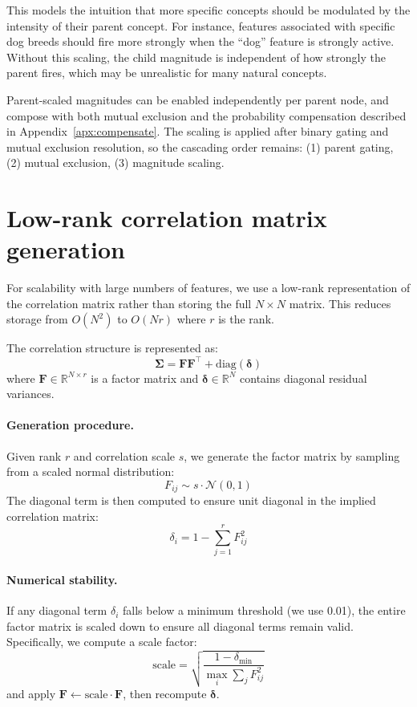 \documentclass{article}
\theoremstyle{plain}
\theoremstyle{definition}
\theoremstyle{remark}
\begin{document}
This models the intuition that more specific concepts should be modulated by the intensity of their parent concept. For instance, features associated with specific dog breeds should fire more strongly when the ``dog'' feature is strongly active. Without this scaling, the child magnitude is independent of how strongly the parent fires, which may be unrealistic for many natural concepts.

Parent-scaled magnitudes can be enabled independently per parent node, and compose with both mutual exclusion and the probability compensation described in Appendix~\ref{apx:compensate}. The scaling is applied after binary gating and mutual exclusion resolution, so the cascading order remains: (1) parent gating, (2) mutual exclusion, (3) magnitude scaling.

\section{Low-rank correlation matrix generation}
\label{apx:correlation}

For scalability with large numbers of features, we use a low-rank representation of the correlation matrix rather than storing the full $N \times N$ matrix. This reduces storage from $O(N^2)$ to $O(Nr)$ where $r$ is the rank.

The correlation structure is represented as:
\begin{equation}
    \boldsymbol{\Sigma} = \mathbf{F}\mathbf{F}^\top + \text{diag}(\boldsymbol{\delta})
\end{equation}
where $\mathbf{F} \in \mathbb{R}^{N \times r}$ is a factor matrix and $\boldsymbol{\delta} \in \mathbb{R}^N$ contains diagonal residual variances.

\paragraph{Generation procedure.} Given rank $r$ and correlation scale $s$, we generate the factor matrix by sampling from a scaled normal distribution:
\begin{equation}
    F_{ij} \sim s \cdot \mathcal{N}(0, 1)
\end{equation}
The diagonal term is then computed to ensure unit diagonal in the implied correlation matrix:
\begin{equation}
    \delta_i = 1 - \sum_{j=1}^{r} F_{ij}^2
\end{equation}

\paragraph{Numerical stability.} If any diagonal term $\delta_i$ falls below a minimum threshold (we use 0.01), the entire factor matrix is scaled down to ensure all diagonal terms remain valid. Specifically, we compute a scale factor:
\begin{equation}
    \text{scale} = \sqrt{\frac{1 - \delta_{\min}}{\max_i \sum_j F_{ij}^2}}
\end{equation}
and apply $\mathbf{F} \leftarrow \text{scale} \cdot \mathbf{F}$, then recompute $\boldsymbol{\delta}$.
\end{document}
